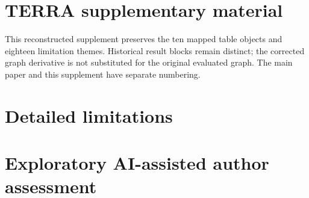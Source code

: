\documentclass[10pt]{article}
\begin{document}
\section*{TERRA supplementary material}
This reconstructed supplement preserves the ten mapped table objects and eighteen limitation themes. Historical result blocks remain distinct; the corrected graph derivative is not substituted for the original evaluated graph. The main paper and this supplement have separate numbering.
\clearpage
\begingroup\small

\endgroup
\clearpage
\begingroup\small

\endgroup
\clearpage
\begingroup\small

\endgroup
\clearpage
\begingroup\small

\endgroup
\clearpage
\begingroup\small

\endgroup
\clearpage
\begingroup\small

\endgroup
\clearpage
\begingroup\small

\endgroup
\clearpage
\begingroup\small

\endgroup
\clearpage
\begingroup\small

\endgroup
\clearpage
\begingroup\small

\endgroup
\clearpage\section{Detailed limitations}\begin{enumerate}\end{enumerate}
\section{Exploratory AI-assisted author assessment}


\end{document}

